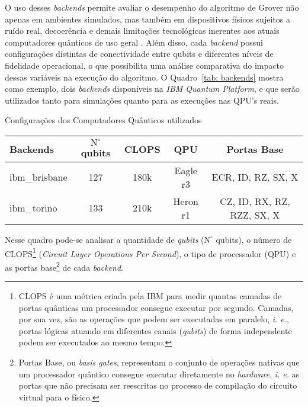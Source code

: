 O uso desses \textit{backends} permite avaliar o desempenho do algoritmo de Grover n\~{a}o apenas em ambientes simulados, mas tamb\'{e}m em dispositivos físicos sujeitos a ruído real, decoer\^{e}ncia e demais limitações tecnológicas inerentes aos atuais computadores qu\^{a}nticos de uso geral \cite{Preskill2018_NISQ}. Al\'{e}m disso, cada \textit{backend} possui configurações distintas de conectividade entre qubits e diferentes níveis de fidelidade operacional, o que possibilita uma an\'{a}lise comparativa do impacto dessas vari\'{a}veis na execuç\~{a}o do algoritmo. O Quadro~\ref{tab: backends} mostra como exemplo, dois \textit{backends} disponíveis na \textit{IBM Quantum Platform}, e que serão utilizados tanto para simulações quanto para as execuções nas QPU's reais. 

\begin{quadro}[htb!]
  \begin{center}
    \caption{Configurações dos Computadores Qu\^{a}nticos utilizados} 
    \label{tab: backends}
    \vspace{0.2cm}
    \footnotesize
    \begin{tabular}{|lcccc|}
      \hline
      Backends & $\text{N}^\circ$ qubits & CLOPS & QPU & Portas Base \\
      \hline
      ibm\_brisbane & 127 & 180k & Eagle r3 & ECR, ID, RZ, SX, X \\
      ibm\_torino & 133 & 210k & Heron r1 & CZ, ID, RX, RZ, RZZ, SX, X \\
      \hline 
    \end{tabular}
  \end{center}
\end{quadro}

Nesse quadro pode-se analisar a quantidade de \textit{qubits} ($\text{N}^\circ$ qubits), o número de CLOPS\footnote{CLOPS é uma métrica criada pela IBM para medir quantas camadas de portas quânticas um processador consegue executar por segundo. Camadas, por sua vez, são as operações que podem ser executadas em paralelo, \textit{i. e.}, portas lógicas atuando em diferentes canais (\textit{qubits}) de forma independente podem ser executados ao mesmo tempo.} (\textit{Circuit Layer Operations Per Second}), o tipo de processador (QPU) e as portas base\footnote{Portas Base, ou \textit{basis gates}, representam o conjunto de operações nativas que um processador quântico consegue executar diretamente no \textit{hardware}, \textit{i. e.} as portas que não precisam ser reescritas no processo de compilação do circuito virtual para o físico.} de cada \textit{backend}.
